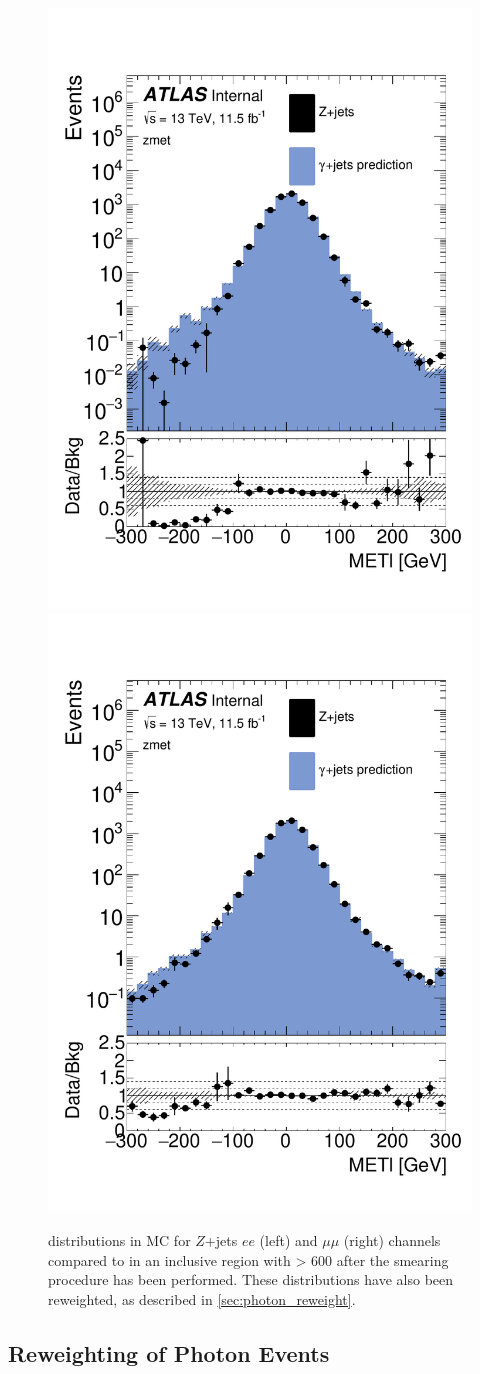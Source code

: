 \begin{centering}
\begin{figure}[!hbt]
\myfloatalign
\includegraphics[width=.45\linewidth]{figures/photons/MC_hist_METl_Pt_0_ee_2j_2016_mcmetl_ptsmrw_smear_zmet_.pdf}
\includegraphics[width=.45\linewidth]{figures/photons/MC_hist_METl_Pt_0_mm_2j_2016_mcmetl_ptsmrw_smear_zmet_.pdf}
\caption{\metl distributions in \ac{MC} for $Z$+jets $ee$ (left) and $\mu\mu$ (right) channels compared to  \gjets in an inclusive region with \HT > 600 \gev after the smearing procedure has been performed. These distributions have also been \pt reweighted, as described in \autoref{sec:photon_reweight}.}
\label{fig:photon_metparallelsmeared}
\end{figure}
\end{centering}

\subsection{\pt Reweighting of Photon Events}
\label{sec:photon_reweight}

